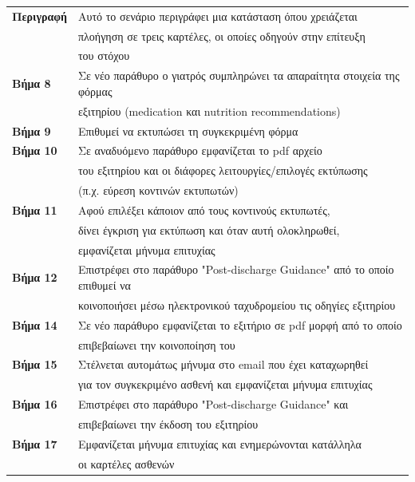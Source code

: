 \documentclass{article}
\newcommand\T{\rule{0pt}{2.6ex}}       %
\newcommand\B{\rule[-1.2ex]{0pt}{0pt}}
\begin{document}
 \vspace{0.2cm}
 \begin{center}
     \begin{tabular}{|l|l|}
     \hline
      \textbf{Περιγραφή} & Αυτό το σενάριο περιγράφει μια κατάσταση όπου χρειάζεται \T \\& πλοήγηση σε τρεις καρτέλες, οι οποίες οδηγούν στην επίτευξη \\& του στόχου \B \\ 
      \hline
      \textbf{Βήμα 8} & Σε νέο παράθυρο ο γιατρός συμπληρώνει τα απαραίτητα στοιχεία της φόρμας \T \\& εξιτηρίου (medication και nutrition recommendations) \\
      \hline
      \textbf{Βήμα 9} & Επιθυμεί να εκτυπώσει τη συγκεκριμένη φόρμα \T\B \\
      \hline
      \textbf{Βήμα 10} & Σε αναδυόμενο παράθυρο εμφανίζεται το pdf αρχείο \T \\& του εξιτηρίου και οι διάφορες λειτουργίες/επιλογές εκτύπωσης \\& (π.χ. εύρεση κοντινών εκτυπωτών) \B \\
      \hline
      \textbf{Βήμα 11} & Αφού επιλέξει κάποιον από τους κοντινούς εκτυπωτές, \T \\& δίνει έγκριση για εκτύπωση και όταν αυτή ολοκληρωθεί, \\& εμφανίζεται μήνυμα επιτυχίας \B \\
      \hline
      \textbf{Βήμα 12} & Επιστρέφει στο παράθυρο "Post-discharge Guidance" από το οποίο επιθυμεί να \T \\& κοινοποιήσει μέσω ηλεκτρονικού ταχυδρομείου τις οδηγίες εξιτηρίου \B \\
      \hline
      \textbf{Βήμα 14} & Σε νέο παράθυρο εμφανίζεται το εξιτήριο σε pdf μορφή από το οποίο \T\\&επιβεβαίωνει την κοινοποίηση του \B \\
      \hline
      \textbf{Βήμα 15} & Στέλνεται αυτομάτως μήνυμα στο email που έχει καταχωρηθεί \T \\& για τον συγκεκριμένο ασθενή και εμφανίζεται μήνυμα επιτυχίας \B \\
      \hline
      \textbf{Βήμα 16} & Επιστρέφει στο παράθυρο "Post-discharge Guidance" και \T \\& επιβεβαίωνει την έκδοση του εξιτηρίου  \B \\   
      \hline
      \textbf{Βήμα 17} & Εμφανίζεται μήνυμα επιτυχίας και ενημερώνονται κατάλληλα \T \\& οι καρτέλες ασθενών  \B \\      
      \hline
     \end{tabular}
 \end{center}
 
\end{document}
